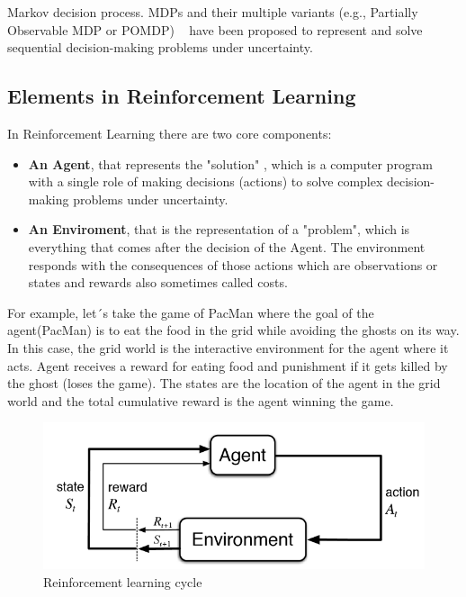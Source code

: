 Markov decision process. MDPs and their multiple variants (e.g., Partially Observable MDP or POMDP) ~\cite{puterman} have been proposed to represent and solve sequential decision-making problems under uncertainty.



\subsection{Elements in Reinforcement Learning}
In Reinforcement Learning there are two core components:
\begin{itemize}
	\item \textbf{An Agent}, that represents the "solution" , which is a computer program with a single role of making decisions (actions) to solve complex decision-making problems under uncertainty.
	\item \textbf{An Enviroment}, that is the representation of a "problem", which is everything that comes after the decision of the Agent. The environment responds with the consequences of those actions which are observations or states and rewards also sometimes called costs.
\end{itemize}



For example, let´s take the game of PacMan where the goal of the agent(PacMan) is to eat the food in the grid while avoiding the ghosts on its way. In this case, the grid world is the interactive environment for the agent where it acts. Agent receives a reward for eating food and punishment if it gets killed by the ghost (loses the game). The states are the location of the agent in the grid world and the total cumulative reward is the agent winning the game.

\begin{figure}[htbp]
	\centering
	\includegraphics[scale=0.40]{imaxes/rl_agentenv.png}
	\caption{Reinforcement learning cycle}
\end{figure}


